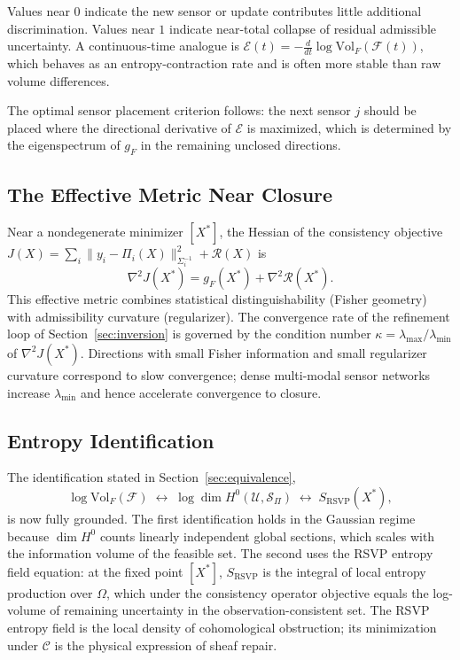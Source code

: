 \documentclass[12pt, oneside]{article}
\begin{document}
Values near $0$ indicate the new sensor or update contributes little additional
discrimination. Values near $1$ indicate near-total collapse of residual admissible
uncertainty. A continuous-time analogue is
$\mathcal{E}(t) = -\frac{d}{dt}\log \mathrm{Vol}_F(\mathcal{F}(t))$,
which behaves as an entropy-contraction rate and is often more stable than raw volume
differences.

The optimal sensor placement criterion follows: the next sensor $j$ should be placed
where the directional derivative of $\mathcal{E}$ is maximized, which is determined by
the eigenspectrum of $g_F$ in the remaining unclosed directions.

\subsection{The Effective Metric Near Closure}

Near a nondegenerate minimizer $[X^*]$, the Hessian of the consistency objective
$J(X) = \sum_i \|y_i - \Pi_i(X)\|_{\Sigma_i^{-1}}^2 + \mathcal{R}(X)$ is
\[
\nabla^2 J(X^*) = g_F(X^*) + \nabla^2 \mathcal{R}(X^*).
\]
This effective metric combines statistical distinguishability (Fisher geometry) with
admissibility curvature (regularizer). The convergence rate of the refinement loop of
Section~\ref{sec:inversion} is governed by the condition number
$\kappa = \lambda_{\max}/\lambda_{\min}$ of $\nabla^2 J(X^*)$. Directions with small
Fisher information and small regularizer curvature correspond to slow convergence; dense
multi-modal sensor networks increase $\lambda_{\min}$ and hence accelerate convergence
to closure.

\subsection{Entropy Identification}

The identification stated in Section~\ref{sec:equivalence},
\[
\log \mathrm{Vol}_F(\mathcal{F})
\;\longleftrightarrow\;
\log \dim H^0(\mathcal{U}, \mathcal{S}_\Pi)
\;\longleftrightarrow\;
S_{\mathrm{RSVP}}(X^*),
\]
is now fully grounded. The first identification holds in the Gaussian regime because
$\dim H^0$ counts linearly independent global sections, which scales with the information
volume of the feasible set. The second uses the RSVP entropy field equation: at the fixed
point $[X^*]$, $S_{\mathrm{RSVP}}$ is the integral of local entropy production over
$\Omega$, which under the consistency operator objective equals the log-volume of
remaining uncertainty in the observation-consistent set. The RSVP entropy field is the
local density of cohomological obstruction; its minimization under $\mathcal{C}$ is the
physical expression of sheaf repair.
\end{document}
